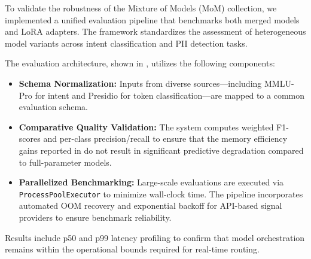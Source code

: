 To validate the robustness of the Mixture of Models (MoM) collection, we implemented a unified evaluation pipeline that benchmarks both merged models and LoRA adapters. The framework standardizes the assessment of heterogeneous model variants across intent classification and PII detection tasks.

The evaluation architecture, shown in , utilizes the following components:

\begin{itemize}
    \item \textbf{Schema Normalization:} Inputs from diverse sources—including MMLU-Pro for intent and Presidio for token classification—are mapped to a common evaluation schema.
    \item \textbf{Comparative Quality Validation:} The system computes weighted F1-scores and per-class precision/recall to ensure that the memory efficiency gains reported in  do not result in significant predictive degradation compared to full-parameter models.
    \item \textbf{Parallelized Benchmarking:} Large-scale evaluations are executed via \texttt{ProcessPoolExecutor} to minimize wall-clock time. The pipeline incorporates automated OOM recovery and exponential backoff for API-based signal providers to ensure benchmark reliability.
\end{itemize}

Results include p50 and p99 latency profiling to confirm that model orchestration remains within the operational bounds required for real-time routing.

